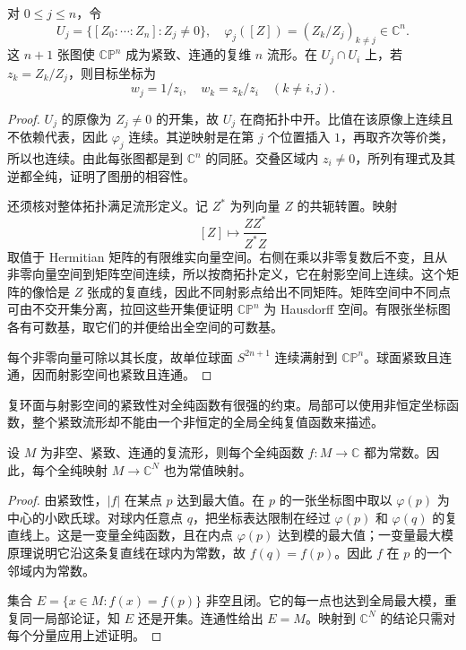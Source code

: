 \begin{proposition}[复射影空间的图册]\label{b3:prop:29-projective-atlas}
对 \(0\le j\le n\)，令
\[
 U_j=\{[Z_0:\cdots:Z_n]:Z_j\ne0\},
 \quad
 \varphi_j([Z])=(Z_k/Z_j)_{k\ne j}\in\mathbb C^n.
\]
这 \(n+1\) 张图使 \(\mathbb{CP}^n\) 成为紧致、连通的复维 \(n\) 流形。在 \(U_j\cap U_i\) 上，若 \(z_k=Z_k/Z_j\)，则目标坐标为
\[
 w_j=1/z_i,
 \quad w_k=z_k/z_i\quad(k\ne i,j).
\]
\end{proposition}
\begin{proof}
\(U_j\) 的原像为 \(Z_j\ne0\) 的开集，故 \(U_j\) 在商拓扑中开。比值在该原像上连续且不依赖代表，因此 \(\varphi_j\) 连续。其逆映射是在第 \(j\) 个位置插入 \(1\)，再取齐次等价类，所以也连续。由此每张图都是到 \(\mathbb C^n\) 的同胚。交叠区域内 \(z_i\ne0\)，所列有理式及其逆都全纯，证明了图册的相容性。

还须核对整体拓扑满足流形定义。记 \(Z^*\) 为列向量 \(Z\) 的共轭转置。映射
\[
 [Z]\longmapsto\frac{ZZ^*}{Z^*Z}
\]
取值于 Hermitian 矩阵的有限维实向量空间。右侧在乘以非零复数后不变，且从非零向量空间到矩阵空间连续，所以按商拓扑定义，它在射影空间上连续。这个矩阵的像恰是 \(Z\) 张成的复直线，因此不同射影点给出不同矩阵。矩阵空间中不同点可由不交开集分离，拉回这些开集便证明 \(\mathbb{CP}^n\) 为 Hausdorff 空间。有限张坐标图各有可数基，取它们的并便给出全空间的可数基。

每个非零向量可除以其长度，故单位球面 \(S^{2n+1}\) 连续满射到 \(\mathbb{CP}^n\)。球面紧致且连通，因而射影空间也紧致且连通。
\end{proof}

复环面与射影空间的紧致性对全纯函数有很强的约束。局部可以使用非恒定坐标函数，整个紧致流形却不能由一个非恒定的全局全纯复值函数来描述。

\begin{proposition}[紧致复流形上的全纯函数]\label{b3:prop:29-compact-functions}
设 \(M\) 为非空、紧致、连通的复流形，则每个全纯函数 \(f:M\to\mathbb C\) 都为常数。因此，每个全纯映射 \(M\to\mathbb C^N\) 也为常值映射。
\end{proposition}
\begin{proof}
由紧致性，\(|f|\) 在某点 \(p\) 达到最大值。在 \(p\) 的一张坐标图中取以 \(\varphi(p)\) 为中心的小欧氏球。对球内任意点 \(q\)，把坐标表达限制在经过 \(\varphi(p)\) 和 \(\varphi(q)\) 的复直线上。这是一变量全纯函数，且在内点 \(\varphi(p)\) 达到模的最大值；一变量最大模原理说明它沿这条复直线在球内为常数，故 \(f(q)=f(p)\)。因此 \(f\) 在 \(p\) 的一个邻域内为常数。

集合 \(E=\{x\in M:f(x)=f(p)\}\) 非空且闭。它的每一点也达到全局最大模，重复同一局部论证，知 \(E\) 还是开集。连通性给出 \(E=M\)。映射到 \(\mathbb C^N\) 的结论只需对每个分量应用上述证明。
\end{proof}

